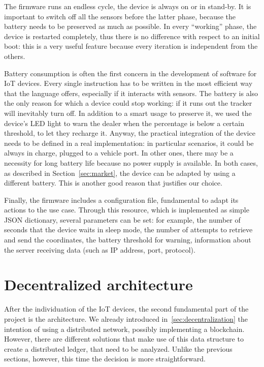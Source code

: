 The firmware runs an endless cycle, the device is always on or in stand-by. It is important to switch off all the sensors before the latter phase, because the battery needs to be preserved as much as possible. In every ``working'' phase, the device is restarted completely, thus there is no difference with respect to an initial boot: this is a very useful feature because every iteration is independent from the others.

Battery consumption is often the first concern in the development of software for IoT devices. Every single instruction has to be written in the most efficient way that the language offers, especially if it interacts with sensors. The battery is also the only reason for which a device could stop working: if it runs out the tracker will inevitably turn off. In addition to a smart usage to preserve it, we used the device's LED light to warn the dealer when the percentage is below a certain threshold, to let they recharge it. Anyway, the practical integration of the device needs to be defined in a real implementation: in particular scenarios, it could be always in charge, plugged to a vehicle port. In other ones, there may be a necessity for long battery life because no power supply is available. In both cases, as described in Section~\ref{sec:market}, the device can be adapted by using a different battery. This is another good reason that justifies our choice.

Finally, the firmware includes a configuration file, fundamental to adapt its actions to the use case. Through this resource, which is implemented as simple JSON dictionary, several parameters can be set: for example, the number of seconds that the device waits in sleep mode, the number of attempts to retrieve and send the coordinates, the battery threshold for warning, information about the server receiving data (such as IP address, port, protocol). 


\chapter{Decentralized architecture}
\label{sec:arch}

After the individuation of the IoT devices, the second fundamental part of the project is the architecture. We already introduced in~\ref{sec:decentralization} the intention of using a distributed network, possibly implementing a blockchain. However, there are different solutions that make use of this data structure to create a distributed ledger, that need to be analyzed. Unlike the previous sections, however, this time the decision is more straightforward.

